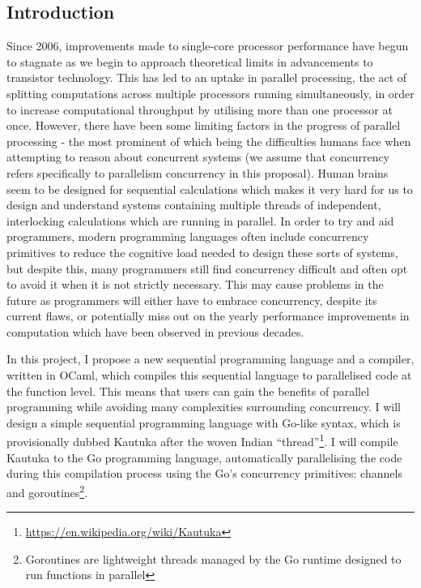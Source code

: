 \label{sec:F}

\begin{refsection}
  \renewcommand{\thesection}{\arabic{section}}
  
  \section{Introduction}

  Since 2006, improvements made to single-core processor performance have begun to stagnate as we begin to approach theoretical limits in advancements to transistor technology. This has led to an uptake in parallel processing, the act of splitting computations across multiple processors running simultaneously, in order to increase computational throughput by utilising more than one processor at once. However, there have been some limiting factors in the progress of parallel processing - the most prominent of which being the difficulties humans face when attempting to reason about concurrent systems (we assume that concurrency refers specifically to parallelism concurrency in this proposal). Human brains seem to be designed for sequential calculations \cite{Sigman7585} which makes it very hard for us to design and understand systems containing multiple threads of independent, interlocking calculations which are running in parallel. In order to try and aid programmers, modern programming languages often include concurrency primitives to reduce the cognitive load needed to design these sorts of systems, but despite this, many programmers still find concurrency difficult and often opt to avoid it when it is not strictly necessary. This may cause problems in the future as programmers will either have to embrace concurrency, despite its current flaws, or potentially miss out on the yearly performance improvements in computation which have been observed in previous decades.

  In this project, I propose a new sequential programming language and a compiler, written in OCaml, which compiles this sequential language to parallelised code at the function level. This means that users can gain the benefits of parallel programming while avoiding many complexities surrounding concurrency. I will design a simple sequential programming language with Go-like syntax, which is provisionally dubbed Kautuka after the woven Indian ``thread''\footnote{\url{https://en.wikipedia.org/wiki/Kautuka}}. I will compile Kautuka to the Go programming language, automatically parallelising the code during this compilation process using the Go's concurrency primitives: channels and goroutines\footnote{Goroutines are lightweight threads managed by the Go runtime designed to run functions in parallel}.


\end{refsection}
